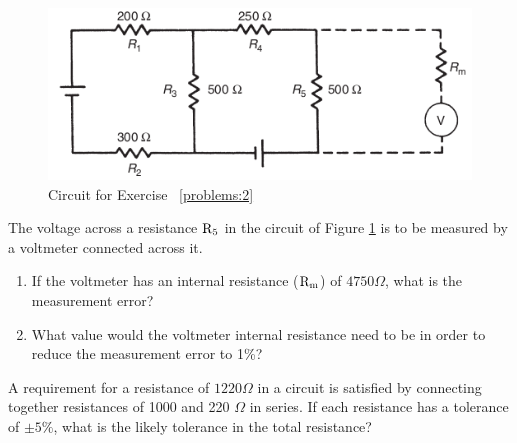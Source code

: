 \documentclass[a4paper,11pt,dvipsnames]{book}
\begin{document}
\begin{question}\label{problems:2}

\begin{figure}[h!]\label{fig:problem2}
\centering
  \includegraphics[width=0.8\linewidth]{problem2}
  \caption{Circuit for Exercise ~\ref{problems:2}} 
\end{figure}

The voltage across a resistance $\rm R_5$ in the circuit of Figure \ref{fig:problem2} is to be measured by a voltmeter connected across it.
\begin{enumerate}
\item If the voltmeter has an internal resistance ($\rm R_m$) of $4750 \Omega$, what is the measurement error?
\item What value would the voltmeter internal resistance need to be in order to reduce the measurement error to 1\%?
\end{enumerate}

\examspace*{15em}

\end{question}
\begin{solution}


\end{solution}


\begin{question}

A requirement for a resistance of $1220 \Omega$ in a circuit is satisfied by connecting together resistances of 1000 and 220 $\Omega$ in series. If each resistance has a tolerance of $\pm 5\%$, what is the likely tolerance in the total resistance?
\examspace*{10em}

\end{question}
\begin{solution}


\end{solution}
\end{document}
